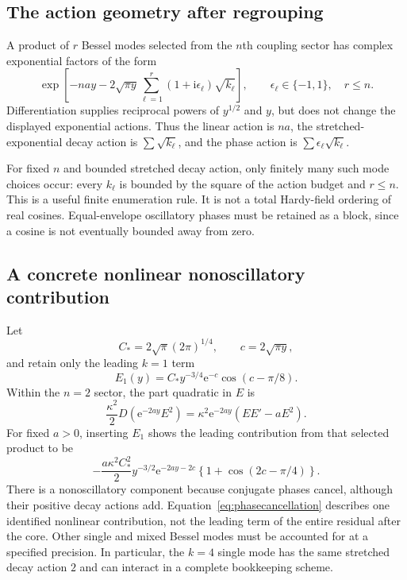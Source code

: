 \documentclass[11pt,a4paper]{article}
\theoremstyle{definition}
\theoremstyle{remark}
\newcommand{\e}{\mathrm e}
\newcommand{\ii}{\mathrm i}
\numberwithin{equation}{section}
\begin{document}
\subsection{The action geometry after regrouping}
A product of $r$ Bessel modes selected from the $n$th coupling sector has complex exponential factors of the form
\begin{equation}\label{eq:complexactions}
 \exp\left[-nay-2\sqrt{\pi y}
             \sum_{\ell=1}^{r}(1+\ii\epsilon_\ell)\sqrt{k_\ell}\right],
 \qquad \epsilon_\ell\in\{-1,1\},\quad r\le n.
\end{equation}
Differentiation supplies reciprocal powers of $y^{1/2}$ and $y$, but does not change the displayed exponential actions. Thus the linear action is $na$, the stretched-exponential decay action is $\sum\sqrt{k_\ell}$, and the phase action is $\sum\epsilon_\ell\sqrt{k_\ell}$.

For fixed $n$ and bounded stretched decay action, only finitely many such mode choices occur: every $k_\ell$ is bounded by the square of the action budget and $r\le n$. This is a useful finite enumeration rule. It is not a total Hardy-field ordering of real cosines. Equal-envelope oscillatory phases must be retained as a block, since a cosine is not eventually bounded away from zero.

\subsection{A concrete nonlinear nonoscillatory contribution}
Let
\[
 C_*=2\sqrt\pi(2\pi)^{1/4},\qquad c=2\sqrt{\pi y},
\]
and retain only the leading $k=1$ term
\[
 E_1(y)=C_*y^{-3/4}\e^{-c}\cos(c-\pi/8).
\]
Within the $n=2$ sector, the part quadratic in $E$ is
\[
 \frac{\kappa^2}{2}D(\e^{-2ay}E^2)
 =\kappa^2\e^{-2ay}(EE'-aE^2).
\]
For fixed $a>0$, inserting $E_1$ shows the leading contribution from that selected product to be
\begin{equation}\label{eq:phasecancellation}
 -\frac{a\kappa^2C_*^2}{2}
 y^{-3/2}\e^{-2ay-2c}
 \left\{1+\cos(2c-\pi/4)\right\}.
\end{equation}
There is a nonoscillatory component because conjugate phases cancel, although their positive decay actions add. Equation~\eqref{eq:phasecancellation} describes one identified nonlinear contribution, not the leading term of the entire residual after the core. Other single and mixed Bessel modes must be accounted for at a specified precision. In particular, the $k=4$ single mode has the same stretched decay action $2$ and can interact in a complete bookkeeping scheme.
\end{document}
